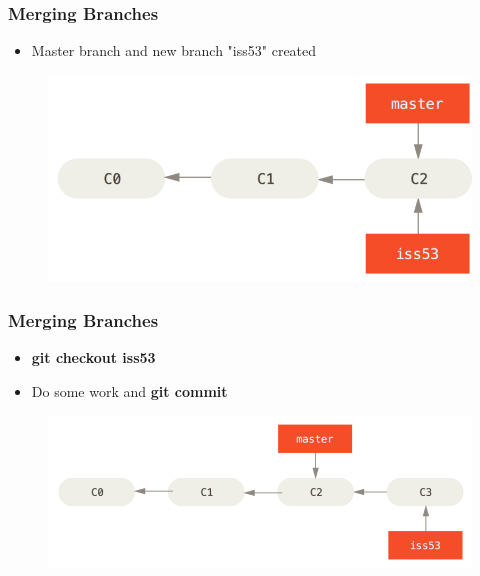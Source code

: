 \documentclass{beamer}
\begin{document}
\begin{frame}
	\frametitle{Merging Branches}
	\begin{itemize}
		\item{Master branch and new branch "iss53" created}
	\end{itemize}
	\begin{figure}
		\includegraphics[scale=0.4]{Merging_Branches-0.png}
	\end{figure}
\end{frame}

\begin{frame}
	\frametitle{Merging Branches}
	\begin{itemize}
		\item{\textbf{git checkout iss53}}
		\item{Do some work and \textbf{git commit}}
	\end{itemize}
	\begin{figure}
		\includegraphics[scale=0.4]{Merging_Branches-1.png}
	\end{figure}
\end{frame}
\end{document}
